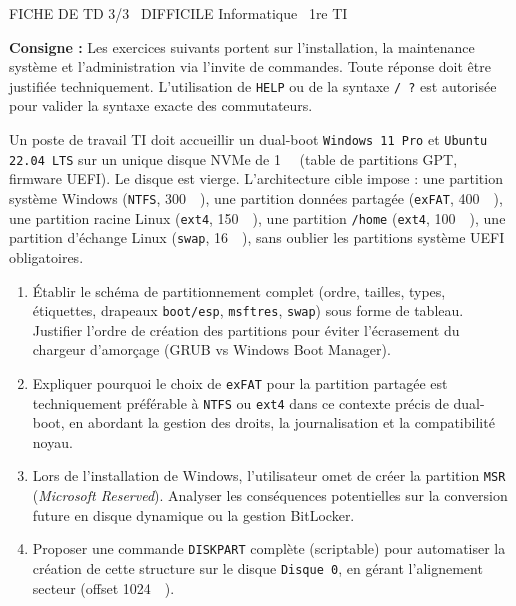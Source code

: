 \documentclass[11pt]{article}
\begin{document}
\begin{tcolorbox}[enhanced,colback=popink,colframe=popink,arc=10pt,boxrule=0pt,left=12pt,right=12pt,top=9pt,bottom=9pt]
{\color{white}\popxbold\small FICHE DE TD 3/3 \textbullet\ DIFFICILE \hfill Informatique \textbullet\ 1re TI\par}
\end{tcolorbox}
\vspace{4pt}
\noindent \textbf{Consigne :} Les exercices suivants portent sur l'installation, la maintenance système et l'administration via l'invite de commandes. Toute réponse doit être justifiée techniquement. L'utilisation de \texttt{HELP} ou de la syntaxe \texttt{/ ?} est autorisée pour valider la syntaxe exacte des commutateurs.

\begin{exercice}
Un poste de travail TI doit accueillir un dual-boot \texttt{Windows 11 Pro} et \texttt{Ubuntu 22.04 LTS} sur un unique disque NVMe de \SI{1}{\tera\byte} (table de partitions GPT, firmware UEFI). Le disque est vierge. L'architecture cible impose : une partition système Windows (\texttt{NTFS}, \SI{300}{\giga\byte}), une partition données partagée (\texttt{exFAT}, \SI{400}{\giga\byte}), une partition racine Linux (\texttt{ext4}, \SI{150}{\giga\byte}), une partition \texttt{/home} (\texttt{ext4}, \SI{100}{\giga\byte}), une partition d'échange Linux (\texttt{swap}, \SI{16}{\giga\byte}), sans oublier les partitions système UEFI obligatoires.
\begin{enumerate}
    \item Établir le schéma de partitionnement complet (ordre, tailles, types, étiquettes, drapeaux \texttt{boot/esp}, \texttt{msftres}, \texttt{swap}) sous forme de tableau. Justifier l'ordre de création des partitions pour éviter l'écrasement du chargeur d'amorçage (GRUB vs Windows Boot Manager).
    \item Expliquer pourquoi le choix de \texttt{exFAT} pour la partition partagée est techniquement préférable à \texttt{NTFS} ou \texttt{ext4} dans ce contexte précis de dual-boot, en abordant la gestion des droits, la journalisation et la compatibilité noyau.
    \item Lors de l'installation de Windows, l'utilisateur omet de créer la partition \texttt{MSR} (\textit{Microsoft Reserved}). Analyser les conséquences potentielles sur la conversion future en disque dynamique ou la gestion BitLocker.
    \item Proposer une commande \texttt{DISKPART} complète (scriptable) pour automatiser la création de cette structure sur le disque \texttt{Disque 0}, en gérant l'alignement secteur (offset \SI{1024}{\kilo\byte}).
\end{enumerate}
\end{exercice}
\end{document}
